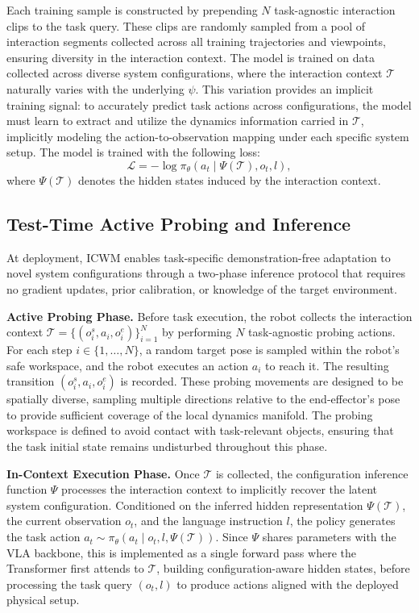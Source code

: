 Each training sample is constructed by prepending $N$ task-agnostic interaction clips to the task query. 
These clips are randomly sampled from a pool of interaction segments collected across all training trajectories and viewpoints, ensuring diversity in the interaction context.
The model is trained on data collected across diverse system configurations, where the interaction context $\mathcal{T}$ naturally varies with the 
underlying $\psi$. This variation provides an implicit training signal: to accurately predict task actions across configurations, the model must learn to extract and utilize 
the dynamics information carried in $\mathcal{T}$, implicitly modeling the action-to-observation mapping under each specific system setup. The model is trained with 
the following loss:
\begin{equation}
\mathcal{L} = -\log \pi_\theta\left(a_t \mid \Psi\left(\mathcal{T}\right), o_t, l\right),
\end{equation}
where $\Psi\left(\mathcal{T}\right)$ denotes the hidden states induced by the 
interaction context. 


\subsection{Test-Time Active Probing and Inference}

At deployment, ICWM enables task-specific demonstration-free adaptation to novel system configurations through a two-phase inference protocol that requires no gradient updates, prior calibration, or knowledge of the target environment.

\textbf{Active Probing Phase.} 
Before task execution, the robot collects the interaction context $\mathcal{T} = \{\left(o^s_i, a_i, o^e_i\right)\}_{i=1}^N$ by performing $N$ task-agnostic probing actions. For each step $i \in \{1, \dots, N\}$, a random target pose is sampled within the robot's safe workspace, and the robot executes an action $a_i$ to reach it. The resulting transition $\left(o^s_i, a_i, o^e_i\right)$ is recorded. These probing movements are designed to be spatially diverse, sampling multiple directions relative to the end-effector's pose to provide sufficient coverage of the local dynamics manifold.
The probing workspace is defined to avoid contact with task-relevant objects, ensuring that the task initial state remains undisturbed throughout this phase.



\textbf{In-Context Execution Phase.} Once $\mathcal{T}$ is collected, the 
configuration inference function $\Psi$ processes the interaction context to implicitly recover the 
latent system configuration. Conditioned on the inferred hidden representation $\Psi\left(\mathcal{T}\right)$, the current observation $o_t$, and the language instruction $l$, the policy generates the task action $a_t \sim \pi_\theta\left(a_t \mid o_t, l, \Psi\left(\mathcal{T}\right)\right)$.
Since $\Psi$ shares parameters with the VLA backbone, this is implemented as a single forward pass where the Transformer first attends to $\mathcal{T}$, building configuration-aware hidden states, before processing the task query $\left(o_t, l\right)$ to produce actions aligned with the deployed physical setup.



